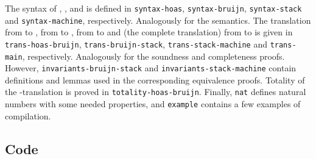The syntax of \hlang, \blang, \slang and \mlang is defined in \texttt{syntax-hoas}, \texttt{syntax-bruijn}, \texttt{syntax-stack} and \texttt{syntax-machine}, respectively.
Analogously for the semantics.
The translation from \hlang to \blang, from \blang to \slang, from \slang to \mlang and (the complete translation) from \hlang to \mlang is given in \texttt{trans-hoas-bruijn}, \texttt{trans-bruijn-stack}, \texttt{trans-stack-machine} and \texttt{trans-main}, respectively.
Analogously for the soundness and completeness proofs.
However, \texttt{invariants-bruijn-stack} and \texttt{invariants-stack-machine} contain definitions and lemmas used in the corresponding equivalence proofs.
Totality of the \hlang-\blang translation is proved in \texttt{totality-hoas-bruijn}.
Finally, \texttt{nat} defines natural numbers with some needed properties, and \texttt{example} contains a few examples of compilation.

\subsection{Code}
\begingroup
\makeatletter
\@totalleftmargin=-2.5cm

\endgroup
